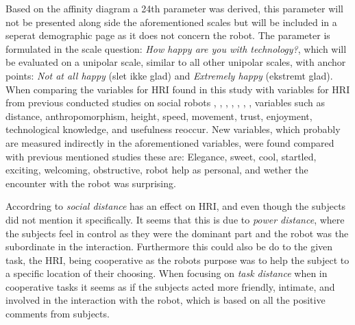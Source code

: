 \noindent
%
Based on the affinity diagram a 24th parameter was derived, this parameter will not be presented along side the aforementioned scales but will be included in a seperat demographic page as it does not concern the robot. The parameter is formulated in the scale question: \textit{How happy are you with technology?}, which will be evaluated on a unipolar scale, similar to all other unipolar scales, with anchor points: \textit{Not at all happy} (slet ikke glad) and \textit{Extremely happy} (ekstremt glad).\\  

\noindent
When comparing the variables for HRI found in this study with variables for HRI from previous conducted studies on social robots \cite{PDF:ExploringInfluencingVariable}, \cite{PDF:SharingALifeHarvey}, \cite{PDF:InTheCompanyofRobots}, \cite{PDF:CloseButNotStuck}, \cite{PDF:TheImpactOfTraveler}, \cite{PDF:HumanRobotEmodiedInteraction}, \cite{PDF:RecommendationEffects}, variables such as distance, anthropomorphism, height, speed, movement, trust, enjoyment, technological knowledge, and usefulness reoccur. New variables, which probably are measured indirectly in the aforementioned variables, were found compared with previous mentioned studies these are: Elegance, sweet, cool, startled, exciting, welcoming, obstructive, robot help as personal, and wether the encounter with the robot was surprising. 

Accordring to \cite{PDF:HowSocialDistanceShapesHRI} \textit{social distance} has an effect on HRI, and even though the subjects did not mention it specifically. It seems that this is due to \textit{power distance}, where the subjects feel in control as they were the dominant part and the robot was the subordinate in the interaction. Furthermore this could also be do to the given task, the HRI, being cooperative as the robots purpose was to help the subject to a specific location of their choosing. When focusing on \textit{task distance} when in cooperative tasks it seems as if the subjects acted more friendly, intimate, and involved in the interaction with the robot, which is based on all the positive comments from subjects.       
 
  




